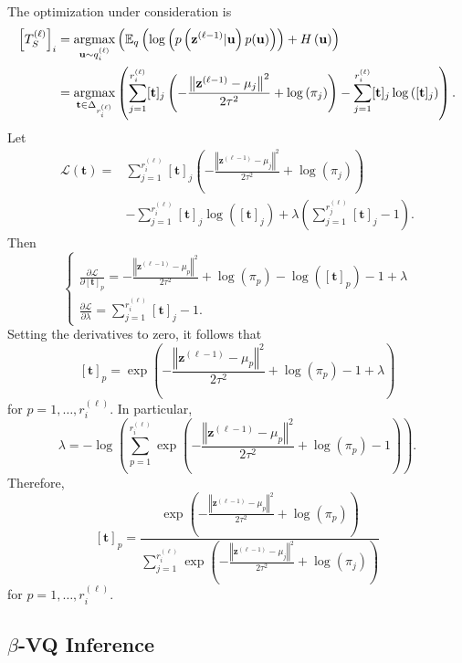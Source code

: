 \begin{tproof}
    The optimization under consideration is
    \begin{align*}
        \left[T_S^{(\ell)}\right]_i&=\operatorname*{\mathrm{argmax}}_{\mathbf{u}\sim q^{(\ell)}_i}\left(\mathbb{E}_q\left(\log\left(p\left(\mathbf{z}^{(\ell-1)}\vert\mathbf{u}\right)p(\mathbf{u})\right)\right)+H\left(\mathbf{u}\right)\right)\\&=\operatorname*{\mathrm{argmax}}_{\mathbf{t}\in\Delta_{r^{(\ell)}_i}}\left(\sum_{j=1}^{r_i^{(\ell)}}[\mathbf{t}]_j\left(-\frac{\left\Vert\mathbf{z}^{(\ell-1)}-\mu_j\right\Vert^2}{2\tau^2}+\log\left(\pi_j\right)\right)-\sum_{j=1}^{r^{(\ell)}_i}[\mathbf{t}]_j\log\left([\mathbf{t}]_j\right)\right).
    \end{align*}
    Let 
    \begin{align*}
        \mathcal{L}(\mathbf{t})=&\sum_{j=1}^{r_i^{(\ell)}}[\mathbf{t}]_j\left(-\frac{\left\Vert\mathbf{z}^{(\ell-1)}-\mu_j\right\Vert^2}{2\tau^2}+\log\left(\pi_j\right)\right)\\&-\sum_{j=1}^{r^{(\ell)}_i}[\mathbf{t}]_j\log\left([\mathbf{t}]_j\right)+\lambda\left(\sum_{j=1}^{r^{(\ell)}_j}[\mathbf{t}]_j-1\right).
    \end{align*}
    Then$$\begin{cases}\frac{\partial\mathcal{L}}{\partial[\mathbf{t}]_p}=-\frac{\left\Vert\mathbf{z}^{(\ell-1)}-\mu_p\right\Vert^2}{2\tau^2}+\log\left(\pi_p\right)-\log\left([\mathbf{t}]_p\right)-1+\lambda\\\frac{\partial\mathcal{L}}{\partial\lambda}=\sum_{j=1}^{r^{(\ell)}_i}[\mathbf{t}]_j-1.\end{cases}$$Setting the derivatives to zero, it follows that $$[\mathbf{t}]_p=\exp\left(-\frac{\left\Vert\mathbf{z}^{(\ell-1)}-\mu_p\right\Vert^2}{2\tau^2}+\log\left(\pi_p\right)-1+\lambda\right)$$for $p=1,\dots,r^{(\ell)}_i$. In particular, $$\lambda=-\log\left(\sum_{p=1}^{r^{(\ell)}_i}\exp\left(-\frac{\left\Vert\mathbf{z}^{(\ell-1)}-\mu_p\right\Vert^2}{2\tau^2}+\log\left(\pi_p\right)-1\right)\right).$$Therefore, $$[\mathbf{t}]_p=\frac{\exp\left(-\frac{\left\Vert\mathbf{z}^{(\ell-1)}-\mu_p\right\Vert^2}{2\tau^2}+\log\left(\pi_p\right)\right)}{\sum_{j=1}^{r^{(\ell)}_i}\exp\left(-\frac{\left\Vert\mathbf{z}^{(\ell-1)}-\mu_j\right\Vert^2}{2\tau^2}+\log\left(\pi_j\right)\right)}$$for $p=1,\dots,r^{(\ell)}_i$.
\end{tproof}

\subsection{$\beta$-VQ Inference}

